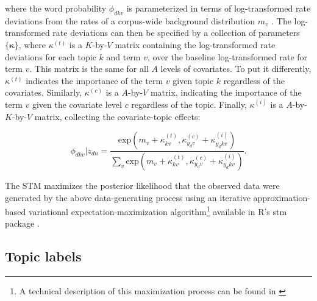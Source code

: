 \documentclass[12pt,a4paper,notitlepage]{article}
\begin{document}
where the word probability $\phi_{dkv}$ is parameterized in terms of log-transformed rate deviations from the rates of a corpus-wide background distribution $m_v$ \citep{roberts_structural_2013}. The log-transformed rate deviations can then be specified by a collection of parameters $\lbrace \boldsymbol{\kappa} \rbrace$, where $\kappa^{(t)}$ is a $K$-by-$V$ matrix containing the log-transformed rate deviations for each topic $k$ and term $v$, over the baseline log-transformed rate for term $v$. This matrix is the same for all $A$ levels of covariates. To put it differently, $\kappa^{(t)}$ indicates the importance of the term $v$ given topic $k$ regardless of the covariates. Similarly, $\kappa^{(c)}$ is a $A$-by-$V$ matrix, indicating the importance of the term $v$ given the covariate level $c$ regardless of the topic. Finally, $\kappa^{(i)}$ is a $A$-by-$K$-by-$V$ matrix, collecting the covariate-topic effects:

\begin{equation}
	\phi_{dkv}|z_{dn}=\frac{\textrm{exp}(m_v+\kappa^{(t)}_{kv},\kappa^{(c)}_{y_dv}+\kappa^{(i)}_{y_dkv})}{\sum_v \textrm{exp}(m_v+\kappa^{(t)}_{kv},\kappa^{(c)}_{y_dv}+\kappa^{(i)}_{y_dkv})}.
\end{equation}

The STM maximizes the posterior likelihood that the observed data were generated by the above data-generating process using an iterative approximation-based variational expectation-maximization algorithm\footnote{A technical description of this maximization process can be found in \citet{roberts_model_2016}} available in R's stm package \citep{roberts_stm:_2016}. 

\subsection{Topic labels}\label{a_labels}


\end{document}
